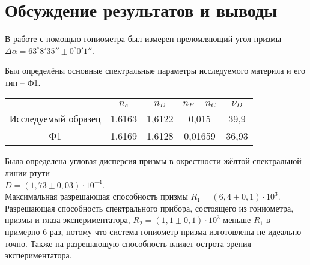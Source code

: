 \section*{Обсуждение результатов и выводы}

В работе с помощью гониометра был измерен преломляющий угол призмы $\Delta \alpha = 63^\circ 8' 35 '' \pm 0^\circ 0' 1''$.

Был определёны основные спектральные параметры исследуемого материла и его тип -- Ф1.
\begin{tabular}{|c|c|c|c|c|}
	\hline
 	& $n_e$ & $n_D$ & $n_F - n_C$ & $\nu_D$ \\
	\hline
	Исследуемый образец & 1,6163 & 1,6122 & 0,015 & 39,9 \\
	\hline
	Ф1 & 1,6169 & 1,6128 & 0,01659 & 36,93\\
	\hline
\end{tabular}

Была определена угловая дисперсия призмы в окрестности жёлтой спектральной линии ртути \\
$D = (1,73 \pm 0,03) \cdot 10^{-4}$. \\
Максимальная разрешающая способность призмы $R_1 = (6,4 \pm 0,1) \cdot 10^3$. \\
Разрешающая способность спектрального прибора, состоящего из гониометра, призмы и глаза экспериментатора, $R_2 = (1,1 \pm 0,1) \cdot 10^3$ меньше $R_1$ в примерно 6 раз, потому что система гониометр-призма изготовлены не идеально точно. Также на разрешающую способность влияет острота зрения экспериментатора.
